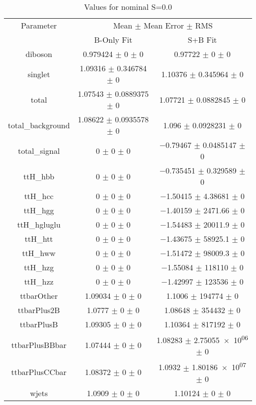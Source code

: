 \begin{table}
\centering
\caption{Values for nominal S=0.0}
\begin{tabular}{ccc}
\toprule
Parameter & \multicolumn{2}{c}{Mean $\pm$ Mean Error $\pm$ RMS}\\
 & B-Only Fit & S+B Fit\\
\midrule
diboson & \num{0.979424} $\pm$ \num{0} $\pm$ \num{0} & \num{0.97722} $\pm$ \num{0} $\pm$ \num{0}\\
singlet & \num{1.09316} $\pm$ \num{0.346784} $\pm$ \num{0} & \num{1.10376} $\pm$ \num{0.345964} $\pm$ \num{0}\\
total & \num{1.07543} $\pm$ \num{0.0889375} $\pm$ \num{0} & \num{1.07721} $\pm$ \num{0.0882845} $\pm$ \num{0}\\
total\_background & \num{1.08622} $\pm$ \num{0.0935578} $\pm$ \num{0} & \num{1.096} $\pm$ \num{0.0928231} $\pm$ \num{0}\\
total\_signal & \num{0} $\pm$ \num{0} $\pm$ \num{0} & \num{-0.79467} $\pm$ \num{0.0485147} $\pm$ \num{0}\\
ttH\_hbb & \num{0} $\pm$ \num{0} $\pm$ \num{0} & \num{-0.735451} $\pm$ \num{0.329589} $\pm$ \num{0}\\
ttH\_hcc & \num{0} $\pm$ \num{0} $\pm$ \num{0} & \num{-1.50415} $\pm$ \num{4.38681} $\pm$ \num{0}\\
ttH\_hgg & \num{0} $\pm$ \num{0} $\pm$ \num{0} & \num{-1.40159} $\pm$ \num{2471.66} $\pm$ \num{0}\\
ttH\_hgluglu & \num{0} $\pm$ \num{0} $\pm$ \num{0} & \num{-1.54483} $\pm$ \num{20011.9} $\pm$ \num{0}\\
ttH\_htt & \num{0} $\pm$ \num{0} $\pm$ \num{0} & \num{-1.43675} $\pm$ \num{58925.1} $\pm$ \num{0}\\
ttH\_hww & \num{0} $\pm$ \num{0} $\pm$ \num{0} & \num{-1.51472} $\pm$ \num{98009.3} $\pm$ \num{0}\\
ttH\_hzg & \num{0} $\pm$ \num{0} $\pm$ \num{0} & \num{-1.55084} $\pm$ \num{118110} $\pm$ \num{0}\\
ttH\_hzz & \num{0} $\pm$ \num{0} $\pm$ \num{0} & \num{-1.42997} $\pm$ \num{123536} $\pm$ \num{0}\\
ttbarOther & \num{1.09034} $\pm$ \num{0} $\pm$ \num{0} & \num{1.1006} $\pm$ \num{194774} $\pm$ \num{0}\\
ttbarPlus2B & \num{1.0777} $\pm$ \num{0} $\pm$ \num{0} & \num{1.08648} $\pm$ \num{354432} $\pm$ \num{0}\\
ttbarPlusB & \num{1.09305} $\pm$ \num{0} $\pm$ \num{0} & \num{1.10364} $\pm$ \num{817192} $\pm$ \num{0}\\
ttbarPlusBBbar & \num{1.07444} $\pm$ \num{0} $\pm$ \num{0} & \num{1.08283} $\pm$ \num{2.75055e+06} $\pm$ \num{0}\\
ttbarPlusCCbar & \num{1.08372} $\pm$ \num{0} $\pm$ \num{0} & \num{1.0932} $\pm$ \num{1.80186e+07} $\pm$ \num{0}\\
wjets & \num{1.0909} $\pm$ \num{0} $\pm$ \num{0} & \num{1.10124} $\pm$ \num{0} $\pm$ \num{0}\\
\bottomrule
\end{tabular}
\end{table}